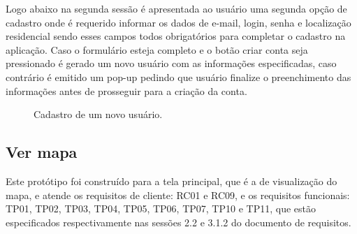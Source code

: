 \documentclass[12pt]{article}
\begin{document}
Logo abaixo na segunda sessão é apresentada ao usuário uma segunda opção de cadastro onde é requerido informar os dados de e-mail, login, senha e localização residencial sendo esses campos todos obrigatórios para completar o cadastro na aplicação. Caso o formulário esteja completo e o botão criar conta seja pressionado é gerado um novo usuário com as informações especificadas, caso contrário é emitido um pop-up pedindo que usuário finalize o preenchimento das informações antes de prosseguir para a criação da conta.



\begin{figure}[h!]
  \caption{Cadastro de um novo usuário.}
  \label{fig:newuser}
\end{figure} 
\vfill%
\pagebreak%

\subsection{Ver mapa}\label{subsec:Secvermapa}

Este protótipo foi construído para a tela principal, que é a de visualização do mapa, e atende os requisitos de cliente: RC01 e RC09, e os requisitos funcionais: TP01, TP02, TP03, TP04, TP05, TP06, TP07, TP10 e TP11, que estão especificados respectivamente nas sessões 2.2 e 3.1.2 do documento de requisitos.
\end{document}
